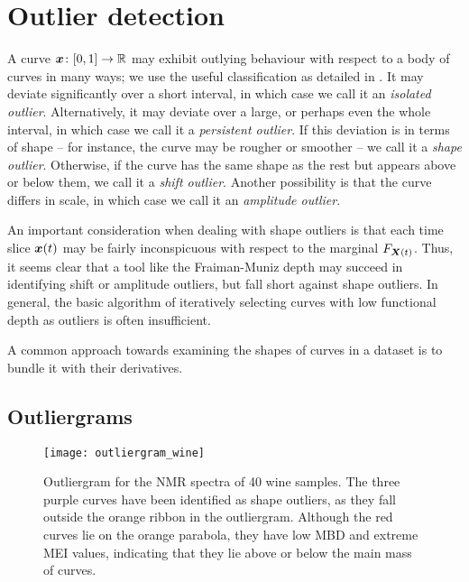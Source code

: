 \section{Outlier detection}

A curve $\bm{x}\colon [0, 1] \to \mathbb{R}$ may exhibit outlying behaviour with respect
to a body of curves in many ways; we use the useful classification as detailed
in \textcite{hubert-rousseeuw-segeart-2015}.
It may deviate significantly over a short interval, in which case we call it
an \emph{isolated outlier}.
Alternatively, it may deviate over a large, or perhaps even the whole
interval, in which case we call it a \emph{persistent outlier}.
If this deviation is in terms of shape -- for instance, the curve may be
rougher or smoother -- we call it a \emph{shape outlier}.
Otherwise, if the curve has the same shape as the rest but appears above or
below them, we call it a \emph{shift outlier}.
Another possibility is that the curve differs in scale, in which case we call
it an \emph{amplitude outlier}.

An important consideration when dealing with shape outliers is that each time
slice $\bm{x}(t)$ may be fairly inconspicuous with respect to the marginal
$F_{\bm{X}(t)}$.
Thus, it seems clear that a tool like the Fraiman-Muniz depth may succeed in
identifying shift or amplitude outliers, but fall short against shape
outliers.
In general, the basic algorithm of iteratively selecting curves with low
functional depth as outliers is often insufficient.

A common approach towards examining the shapes of curves in a dataset is to
bundle it with their derivatives.


\subsection{Outliergrams}

\begin{figure}
    \centering
    \texttt{[image: outliergram\_wine]}
    \caption{
        Outliergram for the NMR spectra of 40 wine samples.
        The three purple curves have been identified as shape outliers, as
        they fall outside the orange ribbon in the outliergram.
        Although the red curves lie on the orange parabola, they have low MBD
        and extreme MEI values, indicating that they lie above or below the
        main mass of curves.
    }
    \label{fig:outliergram_wine}
\end{figure}


